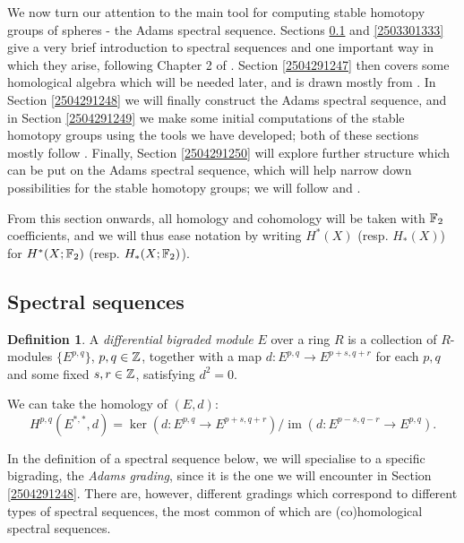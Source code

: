 \documentclass[11pt, titlepage]{article} %
\def\bb{\ensuremath\mathbb}
\def\inte{\ensuremath\mathbb{Z}}
\DeclareMathOperator{\im}{im}
\numberwithin{equation}{subsection}
\theoremstyle{plain}
\theoremstyle{definition}
\newtheorem{definition}[theorem]{Definition}
\begin{document}
We now turn our attention to the main tool for computing stable homotopy groups of spheres - the Adams spectral sequence. Sections \ref{2504041910} and \ref{2503301333} give a very brief introduction to spectral sequences and one important way in which they arise, following Chapter 2 of \autocite{spectral_sequences}. Section \ref{2504291247} then covers some homological algebra which will be needed later, and is drawn mostly from \autocite{weibel}. In Section \ref{2504291248} we will finally construct the Adams spectral sequence, and in Section \ref{2504291249} we make some initial computations of the stable homotopy groups using the tools we have developed; both of these sections mostly follow \autocite{hatcher5}. Finally, Section \ref{2504291250} will explore further structure which can be put on the Adams spectral sequence, which will help narrow down possibilities for the stable homotopy groups; we will follow \autocite{ass} and \autocite{rognes2}. 

From this section onwards, all homology and cohomology will be taken with \(\bb{F}_2\) coefficients, and we will thus ease notation by writing \(H^*(X)\) (resp. \(H_*(X)\)) for \(H^*(X; \bb{F}_2)\) (resp. \(H_*(X;\bb{F}_2)\)).

\subsection{Spectral sequences}\label{2504041910}

\begin{definition}
A \textit{differential bigraded module} \(E\) over a ring \(R\) is a collection of \(R\)-modules \(\{E^{p, q}\}\), \(p, q\in \inte\), together with a map \(d : E^{p, q} \to E^{p+s, q+r}\) for each \(p, q\) and some fixed \(s,r \in \inte\), satisfying \(d^2=0\). 
\end{definition}

We can take the homology of \((E, d)\):
\[H^{p, q}(E^{*, *}, d)=\ker(d : E^{p, q}\to E^{p+s, q+r})/\im(d : E^{p-s, q-r}\to E^{p, q}).\]

In the definition of a spectral sequence below, we will specialise to a specific bigrading, the \textit{Adams grading}, since it is the one we will encounter in Section \ref{2504291248}. There are, however, different gradings which correspond to different types of spectral sequences, the most common of which are (co)homological spectral sequences. 
\end{document}
